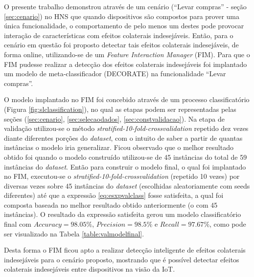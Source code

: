 O presente trabalho demonstrou através de um cenário (``Levar compras'' - seção \ref{sec:cenario}) no HNS que quando dispositivos são compostos para prover uma única funcionalidade, o comportamento de pelo menos um destes pode provocar interação de características com efeitos colaterais indesejáveis. Então, para o cenário em questão foi proposto detectar tais efeitos colaterais indesejáveis, de forma online, utilizando-se de um \textit{Feature Interaction Manager} (FIM). Para que o FIM pudesse realizar a detecção dos efeitos colaterais indesejáveis foi implantado um modelo de meta-classificador (DECORATE) na funcionalidade ``Levar compras''.

O modelo implantado no FIM foi concebido através de um processo classificatório (Figura \ref{fig:slclassification}), no qual as etapas podem ser representadas pelas seções (\ref{sec:cenario}, \ref{sec:selecaodados}, \ref{sec:constvalidacao}). Na etapa de validação utilizou-se o método \textit{stratified-10-fold-crossvalidation} repetido dez vezes diante diferentes porções do \textit{dataset}, com o intuito de saber a partir de quantas instâncias o modelo iria generalizar. Ficou observado que o melhor resultado obtido foi quando o modelo construído utilizou-se de 45 instâncias do total de 59 instâncias do \textit{dataset}. Então para construir o modelo final, o qual foi  implantado no FIM, executou-se o \textit{stratified-10-fold-crossvalidation} (repetido 10 vezes) por diversas vezes sobre 45 instâncias do \textit{dataset} (escolhidas aleatoriamente com seeds diferentes) até que a expressão \ref{eq:esxpvalclass} fosse satisfeita, a qual foi composta baseada no melhor resultado obtido anteriormente (o com 45 instâncias). O resultado da expressão satisfeita gerou um modelo classificatório final com $\textit{Accuracy}=98.05\%$, $\textit{Precision}=98.5\%$ e $\textit{Recall}=97.67\%$, como pode ser visualizado na Tabela \ref{table:valmodelfinal}.

Desta forma o FIM ficou apto a realizar detecção inteligente de efeitos colaterais indesejáveis para o cenário proposto, mostrando que é possível detectar efeitos colaterais indesejáveis entre dispositivos na visão da IoT.

